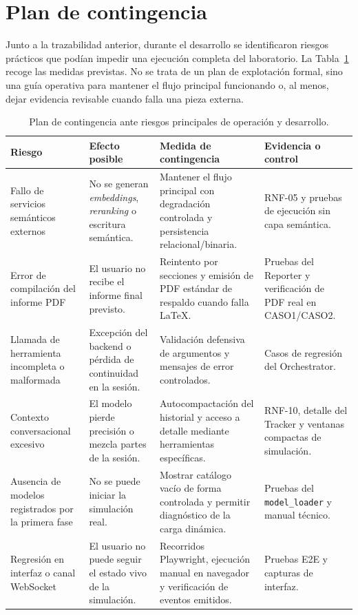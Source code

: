 \clearpage

\section{Plan de contingencia}

Junto a la trazabilidad anterior, durante el desarrollo se identificaron
riesgos prácticos que podían impedir una ejecución completa del laboratorio. La
Tabla~\ref{tab:plan-contingencia} recoge las medidas previstas. No se trata de
un plan de explotación formal, sino una guía operativa para mantener el flujo
principal funcionando o, al menos, dejar evidencia revisable cuando falla una
pieza externa.

\begin{table}[H]
\begin{center}
\scriptsize
\setlength{\tabcolsep}{4pt}
\renewcommand{\arraystretch}{1.18}
\begin{tabular}{|>{\raggedright\arraybackslash}p{3.0cm}|>{\raggedright\arraybackslash}p{3.2cm}|>{\raggedright\arraybackslash}p{3.6cm}|>{\raggedright\arraybackslash}p{2.4cm}|} \hline
\textbf{Riesgo} & \textbf{Efecto posible} & \textbf{Medida de contingencia} & \textbf{Evidencia o control} \\ \hline
Fallo de servicios semánticos externos & No se generan \textit{embeddings}, \textit{reranking} o escritura semántica. & Mantener el flujo principal con degradación controlada y persistencia relacional/binaria. & RNF-05 y pruebas de ejecución sin capa semántica. \\ \hline
Error de compilación del informe PDF & El usuario no recibe el informe final previsto. & Reintento por secciones y emisión de PDF estándar de respaldo cuando falla LaTeX. & Pruebas del Reporter y verificación de PDF real en CASO1/CASO2. \\ \hline
Llamada de herramienta incompleta o malformada & Excepción del backend o pérdida de continuidad en la sesión. & Validación defensiva de argumentos y mensajes de error controlados. & Casos de regresión del Orchestrator. \\ \hline
Contexto conversacional excesivo & El modelo pierde precisión o mezcla partes de la sesión. & Autocompactación del historial y acceso a detalle mediante herramientas específicas. & RNF-10, detalle del Tracker y ventanas compactas de simulación. \\ \hline
Ausencia de modelos registrados por la primera fase & No se puede iniciar la simulación real. & Mostrar catálogo vacío de forma controlada y permitir diagnóstico de la carga dinámica. & Pruebas del \texttt{model\_loader} y manual técnico. \\ \hline
Regresión en interfaz o canal WebSocket & El usuario no puede seguir el estado vivo de la simulación. & Recorridos Playwright, ejecución manual en navegador y verificación de eventos emitidos. & Pruebas E2E y capturas de interfaz. \\ \hline
\end{tabular}
\caption[Plan de contingencia]{Plan de contingencia ante riesgos principales
de operación y desarrollo.}
\label{tab:plan-contingencia}
\end{center}
\end{table}


